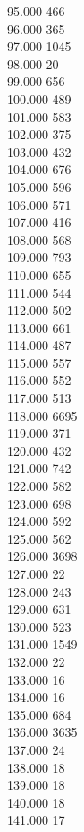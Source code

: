 { 95.000	466 \\
 96.000	365 \\
 97.000	1045 \\
 98.000	20 \\
 99.000	656 \\
 100.000	489 \\
 101.000	583 \\
 102.000	375 \\
 103.000	432 \\
 104.000	676 \\
 105.000	596 \\
 106.000	571 \\
 107.000	416 \\
 108.000	568 \\
 109.000	793 \\
 110.000	655 \\
 111.000	544 \\
 112.000	502 \\
 113.000	661 \\
 114.000	487 \\
 115.000	557 \\
 116.000	552 \\
 117.000	513 \\
 118.000	6695 \\
 119.000	371 \\
 120.000	432 \\
 121.000	742 \\
 122.000	582 \\
 123.000	698 \\
 124.000	592 \\
 125.000	562 \\
 126.000	3698 \\
 127.000	22 \\
 128.000	243 \\
 129.000	631 \\
 130.000	523 \\
 131.000	1549 \\
 132.000	22 \\
 133.000	16 \\
 134.000	16 \\
 135.000	684 \\
 136.000	3635 \\
 137.000	24 \\
 138.000	18 \\
 139.000	18 \\
 140.000	18 \\
 141.000	17 \\
}
